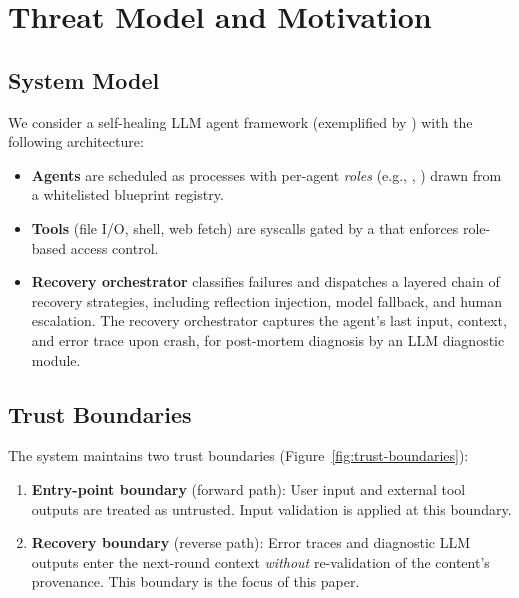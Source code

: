 
\section{Threat Model and Motivation}
\label{sec:threat-model}

\subsection{System Model}

We consider a self-healing LLM agent framework (exemplified by \system{}) with the following architecture:
\begin{itemize}[leftmargin=*]
    \item \textbf{Agents} are scheduled as processes with per-agent \emph{roles} (e.g., , ) drawn from a whitelisted blueprint registry.
    \item \textbf{Tools} (file I/O, shell, web fetch) are syscalls gated by a  that enforces role-based access control.
    \item \textbf{Recovery orchestrator} classifies failures and dispatches a layered chain of recovery strategies, including reflection injection, model fallback, and human escalation. The recovery orchestrator captures the agent's last input, context, and error trace upon crash, for post-mortem diagnosis by an LLM diagnostic module.
\end{itemize}

\subsection{Trust Boundaries}

The system maintains two trust boundaries (Figure~\ref{fig:trust-boundaries}):
\begin{enumerate}[leftmargin=*]
    \item \textbf{Entry-point boundary} (forward path): User input and external tool outputs are treated as untrusted. Input validation is applied at this boundary.
    \item \textbf{Recovery boundary} (reverse path): Error traces and diagnostic LLM outputs enter the next-round context \emph{without} re-validation of the content's provenance. This boundary is the focus of this paper.
\end{enumerate}

